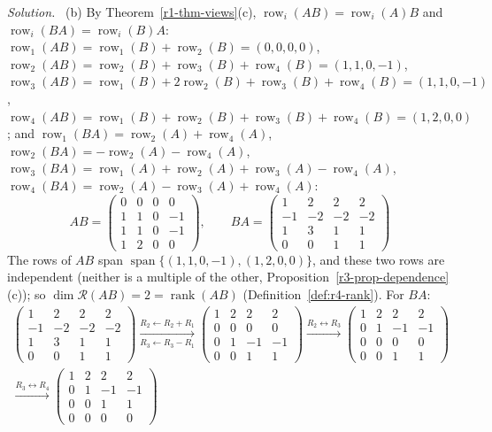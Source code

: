 \documentclass[12pt]{article}
\DeclareMathOperator{\row}{row}
\DeclareMathOperator{\rank}{rank}
\DeclareMathOperator{\Span}{span}
\theoremstyle{definition}
\newenvironment{solution}{\par\noindent\textit{Solution.}\ }{\par\smallskip}
\begin{document}
\begin{solution}
(b) By Theorem~\ref{r1-thm-views}(c), \(\row_i(AB)=\row_i(A)B\) and \(\row_i(BA)=\row_i(B)A\):
\(\row_1(AB)=\row_1(B)+\row_2(B)=(0,0,0,0)\), \(\row_2(AB)=\row_2(B)+\row_3(B)+\row_4(B)=(1,1,0,-1)\),
\(\row_3(AB)=\row_1(B)+2\row_2(B)+\row_3(B)+\row_4(B)=(1,1,0,-1)\),
\(\row_4(AB)=\row_1(B)+\row_2(B)+\row_3(B)+\row_4(B)=(1,2,0,0)\); and \(\row_1(BA)=\row_2(A)+\row_4(A)\),
\(\row_2(BA)=-\row_2(A)-\row_4(A)\), \(\row_3(BA)=\row_1(A)+\row_2(A)+\row_3(A)-\row_4(A)\),
\(\row_4(BA)=\row_2(A)-\row_3(A)+\row_4(A)\):
\[
AB=\begin{pmatrix}0&0&0&0\\1&1&0&-1\\1&1&0&-1\\1&2&0&0\end{pmatrix},\qquad
BA=\begin{pmatrix}1&2&2&2\\-1&-2&-2&-2\\1&3&1&1\\0&0&1&1\end{pmatrix}
\]
The rows of \(AB\) span \(\Span\{(1,1,0,-1),(1,2,0,0)\}\), and these two rows are independent (neither is a multiple
of the other, Proposition~\ref{r3-prop-dependence}(c)); so \(\dim\mathcal R(AB)=2=\rank(AB)\)
(Definition~\ref{def:r4-rank}). For \(BA\):
\[
\begin{gathered}
\begin{pmatrix}1&2&2&2\\-1&-2&-2&-2\\1&3&1&1\\0&0&1&1\end{pmatrix}
\xrightarrow[R_3\leftarrow R_3-R_1]{R_2\leftarrow R_2+R_1}
\begin{pmatrix}1&2&2&2\\0&0&0&0\\0&1&-1&-1\\0&0&1&1\end{pmatrix}
\xrightarrow{R_2\leftrightarrow R_3}
\begin{pmatrix}1&2&2&2\\0&1&-1&-1\\0&0&0&0\\0&0&1&1\end{pmatrix}
\\
\xrightarrow{R_3\leftrightarrow R_4}
\begin{pmatrix}1&2&2&2\\0&1&-1&-1\\0&0&1&1\\0&0&0&0\end{pmatrix}

\end{gathered}\]
\end{solution}
\end{document}
